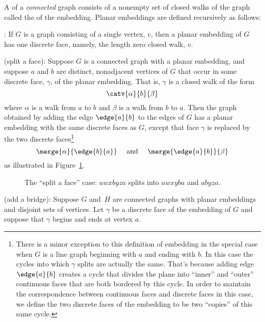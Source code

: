 \begin{definition}\label{def:embedding}%
A  of a \emph{connected} graph consists of a
nonempty set of closed walks of the graph called the  of the embedding.  Planar embeddings are defined recursively
as follows:

: If $G$ is a graph consisting of a single
vertex, $v$, then a planar embedding of $G$ has one discrete face,
namely, the length zero closed walk, $v$.

 (split a face): Suppose $G$ is a
connected graph with a planar embedding, and suppose $a$ and $b$ are
distinct, nonadjacent vertices of $G$ that occur in some discrete
face, $\gamma$, of the planar embedding.  That is, $\gamma$ is a
closed walk of the form
\[
\catv{\alpha}{b}{\beta}
\]
where $\alpha$ is a walk from $a$ to $b$ and $\beta$ is a walk from
$b$ to $a$.  Then the graph obtained by adding the edge $\edge{a}{b}$
to the edges of $G$ has a planar embedding with the same discrete
faces as $G$, except that face $\gamma$ is replaced by the two
discrete faces\footnote{\label{C} There is a minor exception to this
  definition of embedding in the special case when $G$ is a line graph
  beginning with $a$ and ending with $b$.  In this case the cycles
  into which $\gamma$ splits are actually the same.  That's because
  adding edge $\edge{a}{b}$ creates a cycle that divides the plane
  into ``inner'' and ``outer'' continuous faces that are both bordered
  by this cycle.  In order to maintain the correspondence between
  continuous faces and discrete faces in this case, we define the two
  discrete faces of the embedding to be two ``copies'' of this same
  cycle.}
\[
\merge{\alpha}{\edge{b}{a}}
 \quad \text{ and } \quad \merge{\edge{a}{b}}{\beta}
\]
as illustrated in Figure~\ref{fig:face-splitting}.

\begin{figure}


\caption{The ``split a face'' case: $awxbyza$ splits into $awxyba$ and $abyza$.}
\label{fig:face-splitting}
\end{figure}

 (add a bridge): Suppose $G$ and~$H$
are connected graphs with planar embeddings and disjoint sets of
vertices.  Let $\gamma$ be a discrete face of the embedding of $G$ and
suppose that $\gamma$ begins and ends at vertex $a$.
\iffalse
That is, $\gamma$ is of the form
\[
a\dots a.
\]
\fi


\end{definition}
